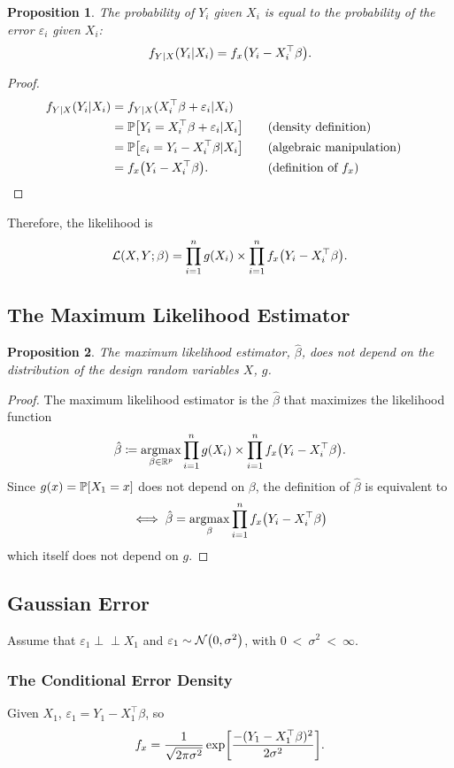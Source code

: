 \documentclass[letterpaper, reqno]{amsart}
\newtheorem{prop}{Proposition}[section]
\numberwithin{equation}{section}
\newcommand{\T}{\top} %
\newcommand{\Prob}[1]{\mathbb{P}\mleft[#1\mright]}
\newcommand{\Li}[1]{\mathcal{L}\mleft( #1 \mright)}  %
\newcommand{\R}{\mathbb{R}}  %
\newcommand{\N}[2]{\mathcal{N}\mleft( #1, #2 \mright)}
\newcommand{\indep}{\perp \!\!\! \perp}  %
\newcommand{\by}[1]{&\quad&\text{(#1)}}
\newcommand{\Bv}{\beta}
\newcommand{\Bvh}{\hat{\beta}}
\newcommand{\ve}{\varepsilon}
\DeclareMathOperator*{\argmax}{argmax}
\begin{document}
\begin{prop}
  The probability of $Y_i$ given $X_i$ is equal to the probability of the error
  $\ve_i$ given $X_i$:
  \[ f_{Y|X}(Y_i | X_i) = f_x\mleft(Y_i - X_i^\T\Bv\mright). \]
\end{prop}

\begin{proof}
  \begin{alignat*}{3}
    f_{Y|X}(Y_i | X_i) &= f_{Y|X}(X_i^\T \Bv + \ve_i | X_i) \\
    &= \Prob{Y_i = X_i^\T \Bv + \ve_i | X_i} \by{density definition} \\
    &= \Prob{\ve_i = Y_i - X_i^\T\Bv | X_i} \by{algebraic manipulation} \\
    &= f_x\mleft(Y_i - X_i^\T\Bv\mright). \by{definition of $f_x$} \tag*{\qedhere}
  \end{alignat*}
\end{proof}

Therefore, the likelihood is
  \[ \Li{X, Y; \Bv} = \prod_{i=1}^n g(X_i) \times \prod_{i=1}^n f_x\mleft(Y_i - X_i^\T\Bv\mright). \]

\subsection{The Maximum Likelihood Estimator}
\begin{prop}
  The maximum likelihood estimator, $\Bvh$, does not depend on the distribution
  of the design random variables $X$, $g$.
\end{prop}

\begin{proof}
  The maximum likelihood estimator is the $\Bvh$ that maximizes the likelihood
  function
  \[ \Bvh \coloneqq \argmax_{\Bv \in \R^p} \prod_{i=1}^n g(X_i) 
    \times \prod_{i=1}^n f_x\mleft(Y_i - X_i^\T\Bv\mright). \]
  Since $g(x) = \Prob{X_1 = x}$ does not depend on $\Bv$, the definition of
  $\Bvh$ is equivalent to
  \[ \iff \Bvh = \argmax_\Bv \prod_{i=1}^n f_x\mleft(Y_i - X_i^\T\Bv\mright) \]
  which itself does not depend on $g$.
\end{proof}

\subsection{Gaussian Error}
Assume that $\ve_1 \indep X_1$ and $\ve_1 \sim \N{0}{\sigma^2}$,
with $0~<~\sigma^2~<~\infty$.

\subsubsection{The Conditional Error Density}
Given $X_1$, $\ve_1 = Y_1 - X_1^\T\Bv$, so
\[ f_x = \frac{1}{\sqrt{2\pi\sigma^2}} \exp \mleft[\frac{-(Y_1 - X_1^\T\Bv)^2}{2\sigma^2}\mright]. \]
\end{document}
